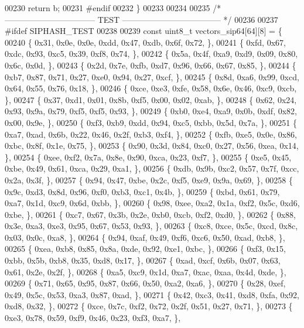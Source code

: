 \begin{DoxyCode}
{00230     \textcolor{keywordflow}{return} b;
00231 \textcolor{preprocessor}{#}\textcolor{preprocessor}{endif}
00232 \}
00233 
00234 
00235 \textcolor{comment}{/* --------------------------------- TEST ------------------------------------ */}
00236 
00237 \textcolor{preprocessor}{#}\textcolor{preprocessor}{ifdef} \textcolor{preprocessor}{SIPHASH\_TEST}
00238 
00239 \textcolor{keyword}{const} uint8\_t vectors\_sip64[64][8] = \{
00240     \{ 0x31, 0x0e, 0x0e, 0xdd, 0x47, 0xdb, 0x6f, 0x72, \},
00241     \{ 0xfd, 0x67, 0xdc, 0x93, 0xc5, 0x39, 0xf8, 0x74, \},
00242     \{ 0x5a, 0x4f, 0xa9, 0xd9, 0x09, 0x80, 0x6c, 0x0d, \},
00243     \{ 0x2d, 0x7e, 0xfb, 0xd7, 0x96, 0x66, 0x67, 0x85, \},
00244     \{ 0xb7, 0x87, 0x71, 0x27, 0xe0, 0x94, 0x27, 0xcf, \},
00245     \{ 0x8d, 0xa6, 0x99, 0xcd, 0x64, 0x55, 0x76, 0x18, \},
00246     \{ 0xce, 0xe3, 0xfe, 0x58, 0x6e, 0x46, 0xc9, 0xcb, \},
00247     \{ 0x37, 0xd1, 0x01, 0x8b, 0xf5, 0x00, 0x02, 0xab, \},
00248     \{ 0x62, 0x24, 0x93, 0x9a, 0x79, 0xf5, 0xf5, 0x93, \},
00249     \{ 0xb0, 0xe4, 0xa9, 0x0b, 0xdf, 0x82, 0x00, 0x9e, \},
00250     \{ 0xf3, 0xb9, 0xdd, 0x94, 0xc5, 0xbb, 0x5d, 0x7a, \},
00251     \{ 0xa7, 0xad, 0x6b, 0x22, 0x46, 0x2f, 0xb3, 0xf4, \},
00252     \{ 0xfb, 0xe5, 0x0e, 0x86, 0xbc, 0x8f, 0x1e, 0x75, \},
00253     \{ 0x90, 0x3d, 0x84, 0xc0, 0x27, 0x56, 0xea, 0x14, \},
00254     \{ 0xee, 0xf2, 0x7a, 0x8e, 0x90, 0xca, 0x23, 0xf7, \},
00255     \{ 0xe5, 0x45, 0xbe, 0x49, 0x61, 0xca, 0x29, 0xa1, \},
00256     \{ 0xdb, 0x9b, 0xc2, 0x57, 0x7f, 0xcc, 0x2a, 0x3f, \},
00257     \{ 0x94, 0x47, 0xbe, 0x2c, 0xf5, 0xe9, 0x9a, 0x69, \},
00258     \{ 0x9c, 0xd3, 0x8d, 0x96, 0xf0, 0xb3, 0xc1, 0x4b, \},
00259     \{ 0xbd, 0x61, 0x79, 0xa7, 0x1d, 0xc9, 0x6d, 0xbb, \},
00260     \{ 0x98, 0xee, 0xa2, 0x1a, 0xf2, 0x5c, 0xd6, 0xbe, \},
00261     \{ 0xc7, 0x67, 0x3b, 0x2e, 0xb0, 0xcb, 0xf2, 0xd0, \},
00262     \{ 0x88, 0x3e, 0xa3, 0xe3, 0x95, 0x67, 0x53, 0x93, \},
00263     \{ 0xc8, 0xce, 0x5c, 0xcd, 0x8c, 0x03, 0x0c, 0xa8, \},
00264     \{ 0x94, 0xaf, 0x49, 0xf6, 0xc6, 0x50, 0xad, 0xb8, \},
00265     \{ 0xea, 0xb8, 0x85, 0x8a, 0xde, 0x92, 0xe1, 0xbc, \},
00266     \{ 0xf3, 0x15, 0xbb, 0x5b, 0xb8, 0x35, 0xd8, 0x17, \},
00267     \{ 0xad, 0xcf, 0x6b, 0x07, 0x63, 0x61, 0x2e, 0x2f, \},
00268     \{ 0xa5, 0xc9, 0x1d, 0xa7, 0xac, 0xaa, 0x4d, 0xde, \},
00269     \{ 0x71, 0x65, 0x95, 0x87, 0x66, 0x50, 0xa2, 0xa6, \},
00270     \{ 0x28, 0xef, 0x49, 0x5c, 0x53, 0xa3, 0x87, 0xad, \},
00271     \{ 0x42, 0xc3, 0x41, 0xd8, 0xfa, 0x92, 0xd8, 0x32, \},
00272     \{ 0xce, 0x7c, 0xf2, 0x72, 0x2f, 0x51, 0x27, 0x71, \},
00273     \{ 0xe3, 0x78, 0x59, 0xf9, 0x46, 0x23, 0xf3, 0xa7, \},
}
\end{DoxyCode}
